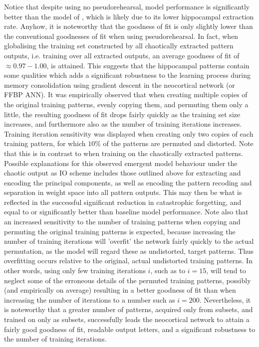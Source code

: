 Notice that despite using no pseudorehearsal, model performance is significantly better than the model of \citep{Hattori2010}, which is likely due to its lower hippocampal extraction rate. Anyhow, it is noteworthy that the goodness of fit is only slightly lower than the conventional goodnesses of fit when using pseudorehearsal. In fact, when globalising the training set constructed by all chaotically extracted pattern outputs, i.e. training over all extracted outputs, an average goodness of fit of $\approx 0.97-1.00$, is attained. This suggests that the hippocampal patterns contain some qualities which adds a significant robustness to the learning process during memory consolidation using gradient descent in the neocortical network (or FFBP ANN). It was empirically observed that when creating multiple copies of the original training patterns, evenly copying them, and permuting them only a little, the resulting goodness of fit drops fairly quickly as the training set size increases, and furthermore also as the number of training iterations increases. Training iteration sensitivity was displayed when creating only two copies of each training pattern, for which $10 \%$ of the patterns are permuted and distorted. Note that this is in contrast to when training on the chaotically extracted patterns. Possible explanations for this observed emergent model behaviour under the chaotic output as IO scheme includes those outlined above for extracting and encoding the principal components, as well as encoding the pattern recoding and separation in weight space into all pattern outputs. This may then be what is reflected in the successful significant reduction in catastrophic forgetting, and equal to or significantly better than baseline model performance. Note also that an increased sensitivity to the number of training patterns when copying and permuting the original training patterns is expected, because increasing the number of training iterations will 'overfit' the network fairly quickly to the actual permutation, as the model will regard these as undistorted, target patterns. Thus overfitting occurs relative to the original, actual undistorted training patterns. In other words, using only few training iterations $i$, such as to $i=15$, will tend to neglect some of the erroneous details of the permuted training patterns, possibly (and empirically on average) resulting in a better goodness of fit than when increasing the number of iterations to a number such as $i=200$. Nevertheless, it is noteworthy that a greater number of patterns, acquired only from subsets, and trained on only as subsets, successfully leads the neocortical network to attain a fairly good goodness of fit, readable output letters, and a significant robustness to the number of training iterations.


